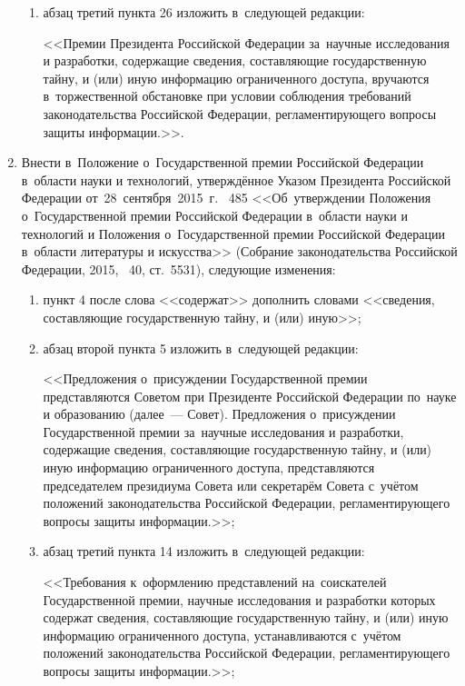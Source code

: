 \documentclass[14pt, a4paper]{extarticle}
\begin{document}
\begin{enumerate}
\begin{enumerate}[label=\asbuk*), ref=\asbuk*]
		\item абзац третий пункта 26 изложить в~следующей редакции:
		
		<<Премии Президента Российской Федерации за~научные исследования и разработки, содержащие сведения, составляющие государственную тайну, и (или) иную информацию ограниченного доступа, вручаются в~торжественной обстановке при условии соблюдения требований законодательства Российской Федерации, регламентирующего вопросы защиты информации.>>.
	\end{enumerate}

	\item Внести в~Положение о~Государственной премии Российской Федерации в~области науки и технологий, утверждённое Указом Президента Российской Федерации от~28~сентября~2015~г. \textnumero~485 <<Об~утверждении Положения о~Государственной премии Российской Федерации в~области науки и технологий и Положения о~Государственной премии Российской Федерации в~области литературы и искусства>> (Собрание законодательства Российской Федерации, 2015, \textnumero~40, ст.~5531), следующие изменения:
	
	\begin{enumerate}[label=\asbuk*), ref=\asbuk*]
		\item пункт 4 после слова <<содержат>> дополнить словами <<сведения, составляющие государственную тайну, и (или) иную>>;
		
		\item абзац второй пункта 5 изложить в~следующей редакции:
		
		<<Предложения о~присуждении Государственной премии представляются Советом при Президенте Российской Федерации по~науке и образованию (далее~--- Совет). Предложения о~присуждении Государственной премии за~научные исследования и разработки, содержащие сведения, составляющие государственную тайну, и (или) иную информацию ограниченного доступа, представляются председателем президиума Совета или секретарём Совета с~учётом положений законодательства Российской Федерации, регламентирующего вопросы защиты информации.>>;
		
		\item абзац третий пункта 14 изложить в~следующей редакции:
		
		<<Требования к~оформлению представлений на~соискателей Государственной премии, научные исследования и разработки которых содержат сведения, составляющие государственную тайну, и (или) иную информацию ограниченного доступа, устанавливаются с~учётом положений законодательства Российской Федерации, регламентирующего вопросы защиты информации.>>;
		

\end{enumerate}
\end{enumerate}
\end{document}
